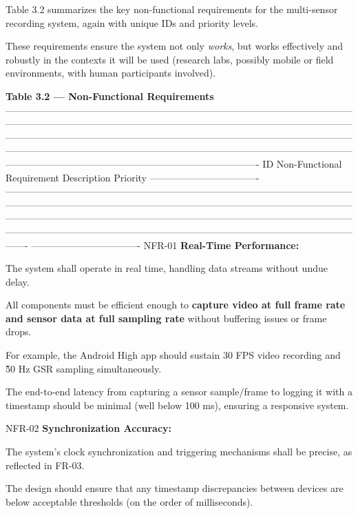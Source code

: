 Table 3.2 summarizes the key non-functional requirements for the multi-sensor
recording system, again with unique IDs and priority levels.

These requirements ensure the system not only \textit{works}, but works effectively
and robustly in the contexts it will be used (research labs, possibly mobile or field
environments, with human participants involved).

\textbf{Table 3.2 --- Non-Functional Requirements}
 -------------------------------------------------------------------------------------------------------------------------------------------------------------------------------------------------------------------------------------------------------------------------------------------------------------------------------------------------------------------------------------------------------------------------------------------------------------------------------------------------------------------------------
 ID Non-Functional Requirement Description Priority
 ----------------------------------
 -------------------------------------------------------------------------------------------------------------------------------------------------------------------------------------------------------------------------------------------------------------------------------------------------------------------------------------------------------------------------------------------------------------------------------------------------------
 ---------------------------------- NFR-01 \textbf{Real-Time Performance:}

The system shall operate in real time, handling data streams without undue delay.

All components must be efficient enough to \textbf{capture video at full frame rate
and sensor data at full sampling rate}
 without buffering issues or frame drops.

For example, the Android High app should sustain 30 FPS video recording and \~50 Hz
GSR sampling simultaneously.

The end-to-end latency from capturing a sensor sample/frame to logging it with a
timestamp should be minimal (well below 100 ms), ensuring a responsive system.

NFR-02 \textbf{Synchronization Accuracy:}

The system's clock synchronization and triggering mechanisms shall be precise, as
reflected in FR-03.

The design should ensure that any timestamp discrepancies between devices are below
acceptable thresholds (on the order of milliseconds).

